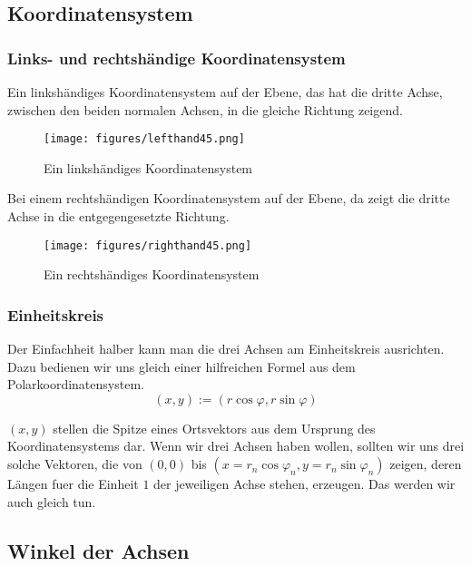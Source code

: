 \documentclass[a4paper]{article}
\begin{document}
\subsection{Koordinatensystem}
\subsubsection{Links- und rechtsh\"andige Koordinatensystem}

Ein linksh\"andiges Koordinatensystem auf der Ebene, das hat die dritte Achse, zwischen den beiden normalen Achsen, in die gleiche Richtung zeigend.\\

\begin{figure}
\caption{Ein linksh\"andiges Koordinatensystem}
\texttt{[image: figures/lefthand45.png]}
\end{figure}

Bei einem rechtsh\"andigen Koordinatensystem auf der Ebene, da zeigt die dritte Achse in die entgegengesetzte Richtung.\\

\begin{figure}
\caption{Ein rechtsh\"andiges Koordinatensystem}
\texttt{[image: figures/righthand45.png]}
\end{figure}

\subsubsection{Einheitskreis}

Der Einfachheit halber kann man die drei Achsen am Einheitskreis ausrichten. Dazu bedienen wir uns gleich einer hilfreichen Formel aus dem Polarkoordinatensystem.\\

\begin{displaymath}
	(x,y) := (r \cos \varphi, r \sin \varphi)
\end{displaymath}

$(x,y)$ stellen die Spitze eines Ortsvektors aus dem Ursprung des Koordinatensystems dar. Wenn wir drei Achsen haben wollen, sollten wir uns drei solche Vektoren, die von $(0,0)$ bis $(x=r_n\cos\varphi_n,y=r_n\sin\varphi_n)$ zeigen, deren L\"angen fuer die Einheit $1$ der jeweiligen Achse stehen, erzeugen. Das werden wir auch gleich tun. \\


\subsection{Winkel der Achsen}
\end{document}
